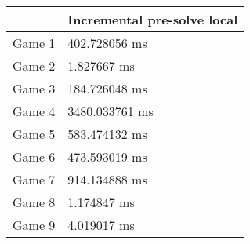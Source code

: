 \begin{tabular}{|l|l|}
	\hline
	& Incremental pre-solve local \\ \hline
	Game 1 & 402.728056 ms \\ \hline
	Game 2 & 1.827667 ms \\ \hline
	Game 3 & 184.726048 ms \\ \hline
	Game 4 & 3480.033761 ms \\ \hline
	Game 5 & 583.474132 ms \\ \hline
	Game 6 & 473.593019 ms \\ \hline
	Game 7 & 914.134888 ms \\ \hline
	Game 8 & 1.174847 ms \\ \hline
	Game 9 & 4.019017 ms \\ \hline
\end{tabular}
